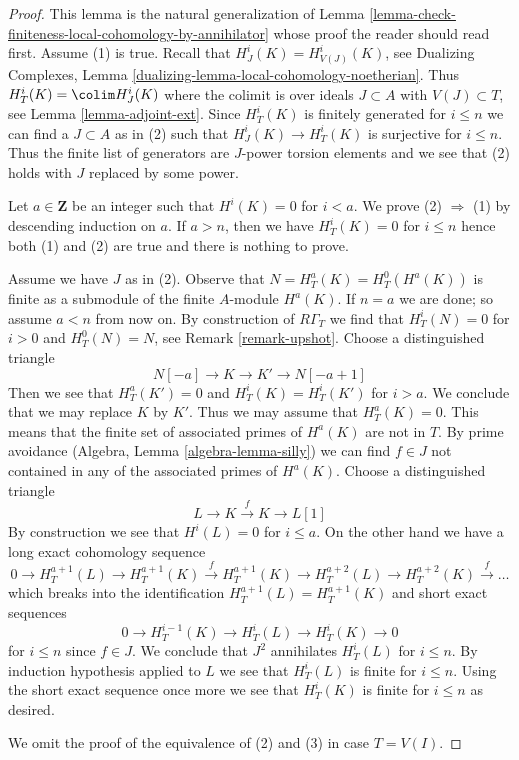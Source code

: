 \begin{proof}
This lemma is the natural generalization of
Lemma \ref{lemma-check-finiteness-local-cohomology-by-annihilator}
whose proof the reader should read first.
Assume (1) is true. Recall that $H^i_J(K) = H^i_{V(J)}(K)$, see
Dualizing Complexes, Lemma \ref{dualizing-lemma-local-cohomology-noetherian}.
Thus $H^i_T(K) = \colim H^i_J(K)$ where the colimit is over ideals
$J \subset A$ with $V(J) \subset T$, see
Lemma \ref{lemma-adjoint-ext}. Since $H^i_T(K)$ is finitely generated
for $i \leq n$ we can find a $J \subset A$ as in (2) such that
$H^i_J(K) \to H^i_T(K)$ is surjective for $i \leq n$.
Thus the finite list of generators are $J$-power torsion elements
and we see that (2) holds with $J$ replaced by some power.

\medskip\noindent
Let $a \in \mathbf{Z}$ be an integer such that $H^i(K) = 0$ for $i < a$.
We prove (2) $\Rightarrow$ (1) by descending induction on $a$.
If $a > n$, then we have $H^i_T(K) = 0$ for $i \leq n$ hence both
(1) and (2) are true and there is nothing to prove.

\medskip\noindent
Assume we have $J$ as in (2). Observe that $N = H^a_T(K) = H^0_T(H^a(K))$
is finite as a submodule of the finite $A$-module $H^a(K)$.
If $n = a$ we are done; so assume $a < n$ from now on. By construction of
$R\Gamma_T$ we find that $H^i_T(N) = 0$ for $i > 0$ and $H^0_T(N) = N$, see
Remark \ref{remark-upshot}. Choose a distinguished triangle
$$
N[-a] \to K \to K' \to N[-a + 1]
$$
Then we see that $H^a_T(K') = 0$ and $H^i_T(K) = H^i_T(K')$ for $i > a$.
We conclude that we may replace $K$ by $K'$. Thus we may assume that
$H^a_T(K) = 0$. This means that the finite set of associated primes of
$H^a(K)$ are not in $T$. By prime avoidance
(Algebra, Lemma \ref{algebra-lemma-silly}) we can find $f \in J$
not contained in any of the associated primes of $H^a(K)$.
Choose a distinguished triangle
$$
L \to K \xrightarrow{f} K \to L[1]
$$
By construction we see that $H^i(L) = 0$ for $i \leq a$.
On the other hand we have a long exact cohomology sequence
$$
0 \to H^{a + 1}_T(L) \to H^{a + 1}_T(K) \xrightarrow{f}
H^{a + 1}_T(K) \to H^{a + 2}_T(L) \to H^{a + 2}_T(K) \xrightarrow{f} \ldots
$$
which breaks into the identification $H^{a + 1}_T(L) = H^{a + 1}_T(K)$
and short exact sequences
$$
0 \to H^{i - 1}_T(K) \to H^i_T(L) \to H^i_T(K) \to 0
$$
for $i \leq n$ since $f \in J$.
We conclude that $J^2$ annihilates $H^i_T(L)$ for $i \leq n$.
By induction hypothesis applied to $L$ we see that $H^i_T(L)$
is finite for $i \leq n$. Using the short exact sequence once more
we see that $H^i_T(K)$ is finite for $i \leq n$ as desired.

\medskip\noindent
We omit the proof of the equivalence of (2) and (3)
in case $T = V(I)$.
\end{proof}

